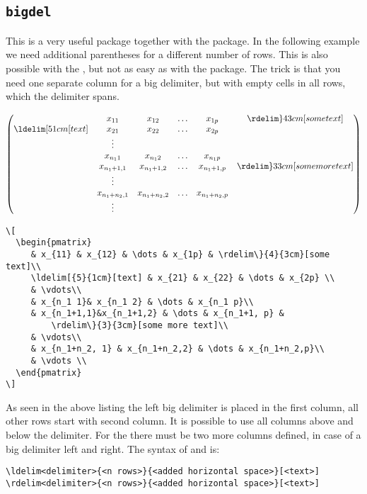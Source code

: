 \begin{table}[htb]
\subsection{\texttt{bigdel}}\label{sec:bigdelim}
This is a very useful package together with the  package.
In the following example we need additional parentheses for a different
number of rows. This is also possible with the ,
but not as easy as with the  package. The trick is that you need one
separate column for a big delimiter, but with empty cells in all rows, which
the delimiter spans. 

\[
  \begin{pmatrix}
     & x_{11} & x_{12} & \dots & x_{1p} & \rdelim\}{4}{3cm}[some text]\\
     \ldelim[{5}{1cm}[text] & x_{21} & x_{22} & \dots & x_{2p} \\
     & \vdots\\
     & x_{n_1 1}& x_{n_1 2} & \dots & x_{n_1 p}\\
     & x_{n_1+1,1}&x_{n_1+1,2} & \dots & x_{n_1+1, p} &
         \rdelim\}{3}{3cm}[some more text]\\
     & \vdots\\
     & x_{n_1+n_2, 1} & x_{n_1+n_2,2} & \dots & x_{n_1+n_2,p}\\
     & \vdots \\
  \end{pmatrix}
\]

\begin{lstlisting}[xleftmargin=-1cm,xrightmargin=-1.5cm]
\[
  \begin{pmatrix}
     & x_{11} & x_{12} & \dots & x_{1p} & \rdelim\}{4}{3cm}[some text]\\
     \ldelim[{5}{1cm}[text] & x_{21} & x_{22} & \dots & x_{2p} \\
     & \vdots\\
     & x_{n_1 1}& x_{n_1 2} & \dots & x_{n_1 p}\\
     & x_{n_1+1,1}&x_{n_1+1,2} & \dots & x_{n_1+1, p} &
         \rdelim\}{3}{3cm}[some more text]\\
     & \vdots\\
     & x_{n_1+n_2, 1} & x_{n_1+n_2,2} & \dots & x_{n_1+n_2,p}\\
     & \vdots \\
  \end{pmatrix}
\]
\end{lstlisting}

As seen in the above listing the left big delimiter is placed in the first
column, all other rows start with second column. It is possible to use all
columns above and below the delimiter. For the 
there must be two more columns defined, in case of a big delimiter left and
right. The syntax of  and  is:
%
\begin{verbatim}
\ldelim<delimiter>{<n rows>}{<added horizontal space>}[<text>]
\rdelim<delimiter>{<n rows>}{<added horizontal space>}[<text>]
\end{verbatim}


\end{table}
